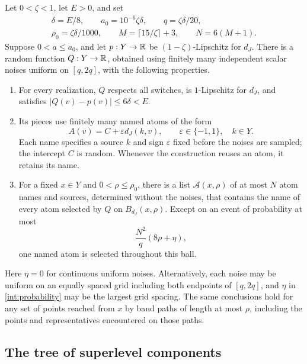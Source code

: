 \begin{theorem}\label{int:interpolation}
Let $0<\zeta<1$, let $E>0$, and set
\begin{equation}\label{int:constants}
 \begin{gathered}
 \delta=E/8,\qquad a_0=10^{-6}\zeta\delta,\qquad
 q=\zeta\delta/20,\\
 \rho_0=\zeta\delta/1000,\qquad
 M=\lceil15/\zeta\rceil+3,\qquad N=6(M+1).
 \end{gathered}
\end{equation}
Suppose $0<a\le a_0$, and let $p:Y\to\mathbb R$ be
$(1-\zeta)$-Lipschitz for $d_J$.  There is a random function
$Q:Y\to\mathbb R$, obtained using finitely many independent scalar noises
uniform on $[q,2q]$, with the following properties.
\begin{enumerate}
\item For every realization, $Q$ respects all switches, is
$1$-Lipschitz for $d_J$, and satisfies $|Q(v)-p(v)|\le6\delta<E$.
\item Its pieces use finitely many named atoms of the form
\begin{equation}\label{int:atom-form}
 A(v)=C+\varepsilon d_J(k,v),\qquad \varepsilon\in\{-1,1\},\quad k\in Y.
\end{equation}
Each name specifies a source $k$ and sign $\varepsilon$ fixed before the
noises are sampled; the intercept $C$ is random. Whenever the construction
reuses an atom, it retains its name.
\item For a fixed $x\in Y$ and $0<\rho\le\rho_0$, there is a list
$\mathcal A(x,\rho)$ of at most $N$ atom names and sources, determined
without the noises, that contains the name of every atom selected by $Q$ on
$B_{d_J}(x,\rho)$.  Except on an event of probability at most
\begin{equation}\label{int:probability}
 \frac{N^2}{q}(8\rho+\eta),
\end{equation}
one named atom is selected throughout this ball.
\end{enumerate}
Here $\eta=0$ for continuous uniform noises.  Alternatively, each noise
may be uniform on an equally spaced grid including both endpoints of
$[q,2q]$, and $\eta$ in \eqref{int:probability} may be the largest grid
spacing.  The same conclusions hold for any set of points reached
from $x$ by band paths of length at most $\rho$, including the points
and representatives encountered on those paths.
\end{theorem}

\subsection{The tree of superlevel components}

